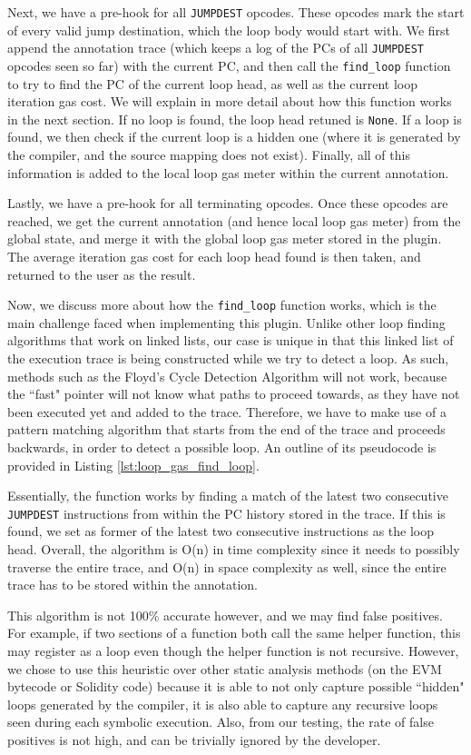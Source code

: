 Next, we have a pre-hook for all \texttt{JUMPDEST} opcodes. These opcodes mark the start of every 
valid jump destination, which the loop body would start with. We first append the annotation
trace (which keeps a log of the PCs of all \texttt{JUMPDEST} opcodes seen so far) with the 
current PC, and then call the \texttt{find_loop} function to try to find the PC of the current loop head,
as well as the current loop iteration gas cost. We will explain in more detail about how this 
function works in the next section.
If no loop is found, the loop head retuned is \texttt{None}.
If a loop is found, we then check if the current loop is a hidden one (where it is generated by the compiler, 
and the source mapping does not exist). 
Finally, all of this information is added to the local loop gas meter within the current annotation.

Lastly, we have a pre-hook for all terminating opcodes. Once these opcodes are reached, we
get the current annotation (and hence local loop gas meter) from the global state, and merge it with
the global loop gas meter stored in the plugin. The average iteration gas cost for each loop head found
is then taken, and returned to the user as the result.

Now, we discuss more about how the \texttt{find_loop} function works, which is
the main challenge faced when implementing this plugin. Unlike other loop finding
algorithms that work on linked lists, our case is unique in that this linked list of 
the execution trace is
being constructed while we try to detect a loop. As such, methods such as the Floyd's
Cycle Detection Algorithm will not work, because the ``fast" pointer will not know
what paths to proceed towards, as they have not been executed yet and added to the trace.
Therefore, we have to make use of a pattern matching algorithm that starts from the end of the trace 
and proceeds backwards, in order to detect a possible loop.
An outline of its
pseudocode is provided in Listing \ref{lst:loop_gas_find_loop}. 

Essentially, the
function works by finding a match of the latest two consecutive \texttt{JUMPDEST} instructions
from within the PC history stored in the trace. If this is found, we set as former of the latest
two consecutive instructions as the loop head. Overall, the algorithm is O(n) in time complexity
since it needs to possibly traverse the entire trace, and O(n) in space complexity as well, since
the entire trace has to be stored within the annotation.

This algorithm is not 100\% accurate however,
and we may find false positives. For example, if two sections of a function both call the same
helper function, this may register as a loop even though the helper function is not recursive.
However, we chose to use this heuristic over other static analysis methods (on the EVM bytecode
or Solidity code) because it is able to not only capture possible ``hidden" loops generated
by the compiler, it is also able to capture any recursive loops seen during each symbolic execution.
Also, from our testing, the rate of false positives is not high, and can be trivially ignored 
by the developer.


